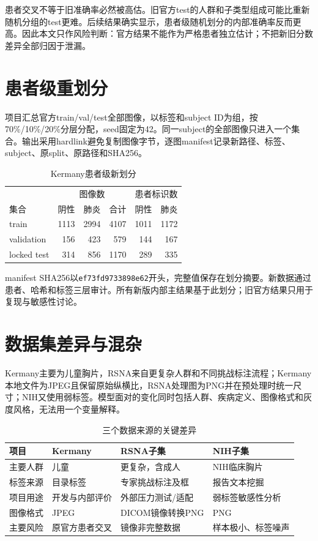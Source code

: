 患者交叉不等于旧准确率必然被高估。旧官方test的人群和子类型组成可能比重新随机分组的test更难。后续结果确实显示，患者级随机划分的内部准确率反而更高。因此本文只作风险判断：官方结果不能作为严格患者独立估计；不把新旧分数差异全部归因于泄漏。

\section{患者级重划分}

项目汇总官方train/val/test全部图像，以标签和subject ID为组，按70\%/10\%/20\%分层分配，seed固定为42。同一subject的全部图像只进入一个集合。输出采用hardlink避免复制图像字节，逐图manifest记录新路径、标签、subject、原split、原路径和SHA256。

\begin{table}[H]
\centering
\caption{Kermany患者级新划分}
\begin{tabular}{lrrrrr}
\toprule & \multicolumn{3}{c}{图像数} & \multicolumn{2}{c}{患者标识数}\\
集合 & 阴性 & 肺炎 & 合计 & 阴性 & 肺炎\\\midrule
train & 1113 & 2994 & 4107 & 1011 & 1172\\
validation & 156 & 423 & 579 & 144 & 167\\
locked test & 314 & 856 & 1170 & 289 & 335\\\bottomrule
\end{tabular}
\end{table}

manifest SHA256以\texttt{ef73fd9733898e62}开头，完整值保存在划分摘要。新数据通过患者、哈希和标签三层审计。所有新版内部主结果基于此划分；旧官方结果只用于复现与敏感性讨论。

\section{数据集差异与混杂}

Kermany主要为儿童胸片，RSNA来自更复杂人群和不同挑战标注流程；Kermany本地文件为JPEG且保留原始纵横比，RSNA处理图为PNG并在预处理时统一尺寸；NIH又使用弱标签。模型面对的变化同时包括人群、疾病定义、图像格式和灰度风格，无法用一个变量解释。

\begin{table}[H]
\centering
\caption{三个数据来源的关键差异}
\begin{tabularx}{\textwidth}{lXXX}
\toprule 项目 & Kermany & RSNA子集 & NIH子集\\\midrule
主要人群 & 儿童 & 更复杂，含成人 & NIH临床胸片\\
标签来源 & 目录标签 & 专家挑战标注及框 & 报告文本挖掘\\
项目用途 & 开发与内部评价 & 外部压力测试/适配 & 弱标签敏感性分析\\
图像格式 & JPEG & DICOM镜像转换PNG & PNG\\
主要风险 & 原官方患者交叉 & 镜像非完整数据 & 样本极小、标签噪声\\\bottomrule
\end{tabularx}
\end{table}

